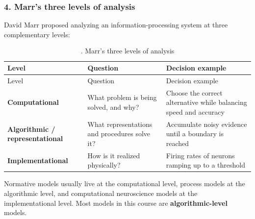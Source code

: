 \subsubsection{4. Marr's three levels of analysis}

David Marr proposed analyzing an information-processing system at three
complementary levels:

\begin{longtable}[]{@{}
  >{\raggedright\arraybackslash}p{}
  >{\raggedright\arraybackslash}p{}
  >{\raggedright\arraybackslash}p{}@{}}
\caption{. Marr's three levels of analysis}\tabularnewline
\toprule\noalign{}
\begin{minipage}[b]{\linewidth}\raggedright
Level
\end{minipage} & \begin{minipage}[b]{\linewidth}\raggedright
Question
\end{minipage} & \begin{minipage}[b]{\linewidth}\raggedright
Decision example
\end{minipage} \\
\midrule\noalign{}
\endfirsthead
\toprule\noalign{}
\begin{minipage}[b]{\linewidth}\raggedright
Level
\end{minipage} & \begin{minipage}[b]{\linewidth}\raggedright
Question
\end{minipage} & \begin{minipage}[b]{\linewidth}\raggedright
Decision example
\end{minipage} \\
\midrule\noalign{}
\endhead
\bottomrule\noalign{}
\endlastfoot
\textbf{Computational} & What problem is being solved, and why? & Choose
the correct alternative while balancing speed and accuracy \\
\textbf{Algorithmic / representational} & What representations and
procedures solve it? & Accumulate noisy evidence until a boundary is
reached \\
\textbf{Implementational} & How is it realized physically? & Firing
rates of neurons ramping up to a threshold \\
\end{longtable}

Normative models usually live at the computational level, process models
at the algorithmic level, and computational neuroscience models at the
implementational level. Most models in this course are
\textbf{algorithmic-level} models.

